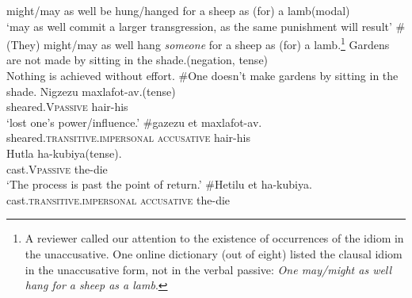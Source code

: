 \documentclass[output=paper,
modfonts
]{LSP/langsci}
\begin{document}
\ea
	\ea might/may as well be hung/hanged for a sheep as (for) a lamb\hfill (modal)\\
	`may as well commit a larger transgression, as the same punishment will
	result'
	\ex \#(They) might/may as well hang \emph{someone} for a sheep as (for) a
	lamb.\footnote{A reviewer called our attention to the existence of
  	occurrences of the idiom in the unaccusative. One online dictionary
  	(out of eight) listed the clausal idiom in the unaccusative form, not
  	in the verbal passive: \emph{One may/might as well hang for a sheep as
  	a lamb}.}
	\z
\ex
	\ea Gardens are not made by sitting in the shade.\hfill (negation, tense)\\
	Nothing is achieved without effort.
	\ex \#One doesn't make gardens by sitting in the shade.
	\z
\ex
	\ea \gll Nigzezu maxlafot-av.\hfill (tense)\\
	sheared.V\textsc{passive} hair-his\\
	\glt `lost one's power/influence.'
	\ex \gll \#gazezu et maxlafot-av.\\
	sheared.\textsc{transitive.impersonal} \textsc{accusative} hair-his\\
	\z
\ex
	\ea \gll Hutla ha-kubiya\hfill (tense).\\
	cast.\textsc{Vpassive} the-die\\
	\glt `The process is past the point of return.'
	\ex \gll \#Hetilu et ha-kubiya.\\
	cast.\textsc{transitive.impersonal} \textsc{accusative} the-die\\
	\z
\z
\end{document}
